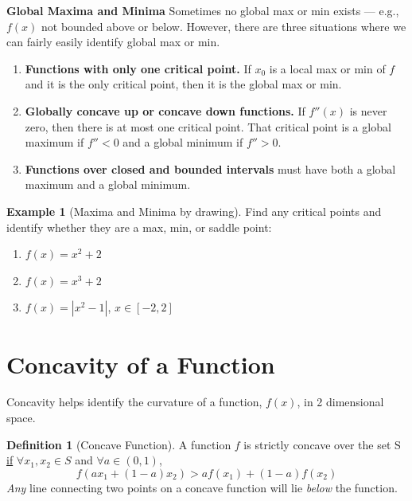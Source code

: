 \documentclass[
]{book}
\providecommand{\tightlist}{%
  \setlength{\itemsep}{0pt}\setlength{\parskip}{0pt}}
\theoremstyle{definition}
\newtheorem{definition}{Definition}[chapter]
\theoremstyle{definition}
\newtheorem{example}{Example}[chapter]
\theoremstyle{definition}
\theoremstyle{remark}
\begin{document}
\textbf{Global Maxima and Minima} Sometimes no global max or min exists --- e.g., \(f(x)\) not bounded above or below. However, there are three situations where we can fairly easily identify global max or min.

\begin{enumerate}
\def\labelenumi{\arabic{enumi}.}
\tightlist
\item
  \textbf{Functions with only one critical point.} If \(x_0\) is a local max or min of \(f\) and it is the only critical point, then it is the global max or min.
\item
  \textbf{Globally concave up or concave down functions.} If \(f''(x)\) is never zero, then there is at most one critical point. That critical point is a global maximum if \(f''<0\) and a global minimum if \(f''>0\).
\item
  \textbf{Functions over closed and bounded intervals} must have both a global maximum and a global minimum.
\end{enumerate}

\begin{example}[Maxima and Minima by drawing]
\protect\hypertarget{exm:unnamed-chunk-46}{}{\label{exm:unnamed-chunk-46} {} }
Find any critical points and identify whether they are a max, min, or saddle point:

\begin{enumerate}
\def\labelenumi{\arabic{enumi}.}
\tightlist
\item
  \(f(x)=x^2+2\)
\item
  \(f(x)=x^3+2\)
\item
  \(f(x)=|x^2-1|\), \(x\in [-2,2]\)
\end{enumerate}
\end{example}

\hypertarget{concavity-of-a-function}{%
\section{Concavity of a Function}\label{concavity-of-a-function}}

Concavity helps identify the curvature of a function, \(f(x)\), in 2 dimensional space.

\begin{definition}[Concave Function]
\protect\hypertarget{def:unnamed-chunk-47}{}{\label{def:unnamed-chunk-47} {} }A function \(f\) is strictly concave over the set S \underline{if} \(\forall x_1,x_2 \in S\) and \(\forall a \in (0,1)\), \[f(ax_1 + (1-a)x_2) > af(x_1) + (1-a)f(x_2)\]
\textit{Any} line connecting two points on a concave function will lie \textit{below} the function.
\end{definition}
\end{document}
